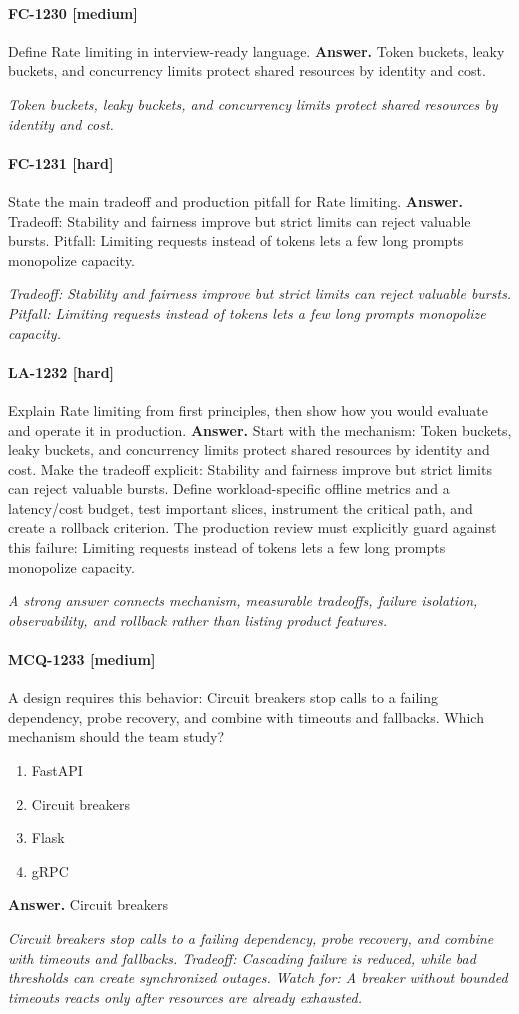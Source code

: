 \paragraph{FC-1230 [medium]} Define Rate limiting in interview-ready language.
\noindent\textbf{Answer.} Token buckets, leaky buckets, and concurrency limits protect shared resources by identity and cost.
\par\textit{Token buckets, leaky buckets, and concurrency limits protect shared resources by identity and cost.}
\paragraph{FC-1231 [hard]} State the main tradeoff and production pitfall for Rate limiting.
\noindent\textbf{Answer.} Tradeoff: Stability and fairness improve but strict limits can reject valuable bursts. Pitfall: Limiting requests instead of tokens lets a few long prompts monopolize capacity.
\par\textit{Tradeoff: Stability and fairness improve but strict limits can reject valuable bursts. Pitfall: Limiting requests instead of tokens lets a few long prompts monopolize capacity.}
\paragraph{LA-1232 [hard]} Explain Rate limiting from first principles, then show how you would evaluate and operate it in production.
\noindent\textbf{Answer.} Start with the mechanism: Token buckets, leaky buckets, and concurrency limits protect shared resources by identity and cost. Make the tradeoff explicit: Stability and fairness improve but strict limits can reject valuable bursts. Define workload-specific offline metrics and a latency/cost budget, test important slices, instrument the critical path, and create a rollback criterion. The production review must explicitly guard against this failure: Limiting requests instead of tokens lets a few long prompts monopolize capacity.
\par\textit{A strong answer connects mechanism, measurable tradeoffs, failure isolation, observability, and rollback rather than listing product features.}
\paragraph{MCQ-1233 [medium]} A design requires this behavior: Circuit breakers stop calls to a failing dependency, probe recovery, and combine with timeouts and fallbacks. Which mechanism should the team study?
\begin{enumerate}[label=\Alph*.]
\item FastAPI
\item Circuit breakers
\item Flask
\item gRPC
\end{enumerate}
\noindent\textbf{Answer.} Circuit breakers
\par\textit{Circuit breakers stop calls to a failing dependency, probe recovery, and combine with timeouts and fallbacks. Tradeoff: Cascading failure is reduced, while bad thresholds can create synchronized outages. Watch for: A breaker without bounded timeouts reacts only after resources are already exhausted.}
